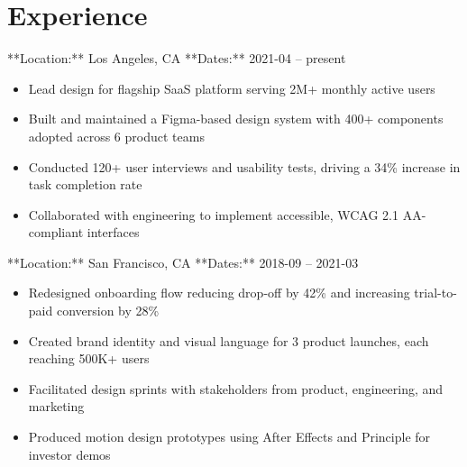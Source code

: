 
\section{Experience}



**Location:** Los Angeles, CA **Dates:** 2021-04 – present


\begin{itemize}

  \item Lead design for flagship SaaS platform serving 2M+ monthly active users

  \item Built and maintained a Figma-based design system with 400+ components adopted across 6 product teams

  \item Conducted 120+ user interviews and usability tests, driving a 34\% increase in task completion rate

  \item Collaborated with engineering to implement accessible, WCAG 2.1 AA-compliant interfaces

\end{itemize}




**Location:** San Francisco, CA **Dates:** 2018-09 – 2021-03


\begin{itemize}

  \item Redesigned onboarding flow reducing drop-off by 42\% and increasing trial-to-paid conversion by 28\%

  \item Created brand identity and visual language for 3 product launches, each reaching 500K+ users

  \item Facilitated design sprints with stakeholders from product, engineering, and marketing

  \item Produced motion design prototypes using After Effects and Principle for investor demos

\end{itemize}




